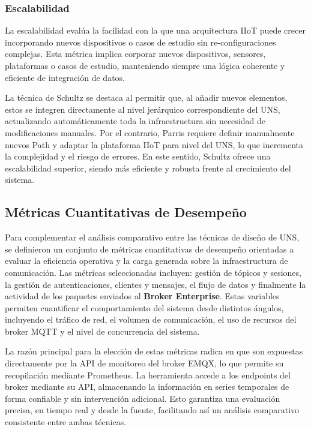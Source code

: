 \subsubsection{Escalabilidad}
La escalabilidad evalúa la facilidad con la que una arquitectura IIoT puede crecer incorporando nuevos dispositivos o casos de estudio sin re-configuraciones complejas. Esta métrica implica corporar nuevos dispositivos, sensores, plataformas o casos de estudio, manteniendo siempre una lógica coherente y eficiente de integración de datos. 

La técnica de Schultz se destaca al permitir que, al añadir nuevos elementos, estos se integren directamente al nivel jerárquico correspondiente del UNS, actualizando automáticamente toda la infraestructura sin necesidad de modificaciones manuales. Por el contrario, Parris requiere definir manualmente nuevos Path y adaptar la plataforma IIoT para nivel del UNS, lo que incrementa la complejidad y el riesgo de errores. En este sentido, Schultz ofrece una escalabilidad superior, siendo más eficiente y robusta frente al crecimiento del sistema.

    

\subsection{Métricas Cuantitativas de Desempeño}

Para complementar el análisis comparativo entre las técnicas de diseño de UNS, se definieron un conjunto de métricas cuantitativas de desempeño orientadas a evaluar la eficiencia operativa y la carga generada sobre la infraestructura de comunicación. Las métricas seleccionadas incluyen: gestión de tópicos y sesiones, la gestión de autenticaciones, clientes y mensajes, el flujo de datos y finalmente la actividad de los paquetes enviados al \textbf{Broker Enterprise}. Estas variables permiten cuantificar el comportamiento del sistema desde distintos ángulos, incluyendo el tráfico de red, el volumen de comunicación, el uso de recursos del broker MQTT y el nivel de concurrencia del sistema.

La razón principal para la elección de estas métricas radica en que son expuestas directamente por la API de monitoreo del broker EMQX, lo que permite su recopilación mediante Prometheus. La herramienta accede a los endpoints del broker mediante su API, almacenando la información en series temporales de forma confiable y sin intervención adicional. Esto garantiza una evaluación precisa, en tiempo real y desde la fuente, facilitando así un análisis comparativo consistente entre ambas técnicas.

